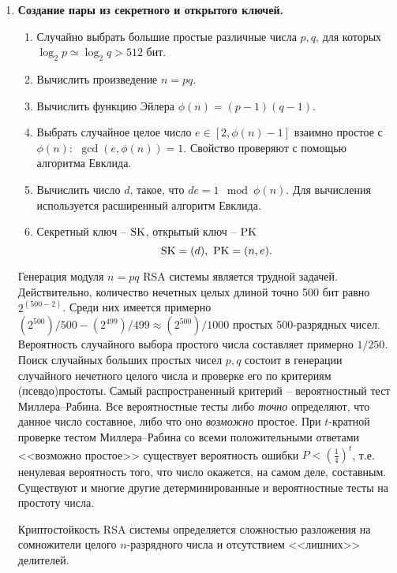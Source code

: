 \begin{enumerate}
    \item \textbf{Создание пары из секретного и открытого ключей.}
        \begin{enumerate}
            \item Случайно выбрать большие простые различные числа $p,q$, для которых $\log_2 p \simeq \log_2 q > 512$ бит.
            \item Вычислить произведение $n = pq$.
            \item Вычислить функцию Эйлера $\phi(n) = (p-1)(q-1)$.
            \item Выбрать случайное целое число $e \in [2, \phi(n)-1]$ взаимно простое с $\phi(n)$: $~ \gcd(e, \phi(n)) = 1$. Свойство проверяют с помощью алгоритма Евклида.
            \item Вычислить число $d$, такое, что  $d e= 1 \mod \phi(n)$. Для вычисления используется расширенный алгоритм Евклида.
            \item Секретный ключ -- $\textrm{SK}$, открытый ключ -- $\textrm{PK}$
                \[ \textrm{SK} = (d), ~ \textrm{PK} = (n, e). \]

        \end{enumerate}

Генерация модуля $n = pq$ RSA системы является трудной задачей. Действительно, количество нечетных целых длиной точно 500 бит равно $2^{(500-2)}$. Среди них имеется примерно
$(2^{500})/500 - (2^{499})/499 \approx (2^{500})/1000$ простых 500-разрядных чисел. Вероятность случайного выбора простого числа составляет примерно $1/250 $.
Поиск случайных больших простых чисел $p,q$ состоит в  генерации случайного нечетного целого числа и проверке его по критериям (псевдо)простоты. Самый распространенный критерий -- вероятностный тест Миллера--Рабина. Все вероятностные тесты либо \emph{точно} определяют, что данное  число  составное, либо что оно \emph{возможно} простое. При $t$-кратной проверке тестом Миллера--Рабина со всеми положительными ответами <<возможно простое>> существует вероятность ошибки $P < \left( \frac{1}{4} \right)^t$, т.е. ненулевая вероятность того, что число окажется, на самом деле, составным. Существуют и многие другие детерминированные и вероятностные тесты на простоту числа.

Криптостойкость RSA системы определяется сложностью разложения на сомножители целого $n$-разрядного числа и отсутствием <<лишних>> делителей.


\end{enumerate}
